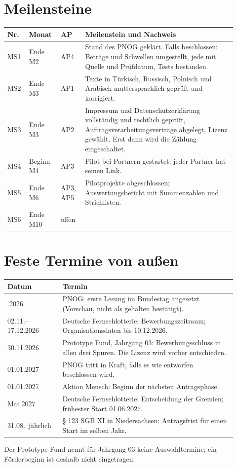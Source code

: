 \documentclass[11pt,a4paper,parskip=half-]{scrartcl}
\begin{document}
\section*{Meilensteine}
\begin{longtable}{@{}L{0.07\linewidth}L{0.13\linewidth}L{0.10\linewidth}L{0.62\linewidth}@{}}
\toprule
\textbf{Nr.} & \textbf{Monat} & \textbf{AP} & \textbf{Meilenstein und Nachweis} \\
\midrule
\endhead
\bottomrule
\endlastfoot
MS1 & Ende M2 & AP4 & Stand des PNOG geklärt. Falls beschlossen: Beträge und Schwellen umgestellt,
  jede mit Quelle und Prüfdatum, Tests bestanden. \\
MS2 & Ende M3 & AP1 & Texte in Türkisch, Russisch, Polnisch und Arabisch muttersprachlich geprüft und
  korrigiert. \\
MS3 & Ende M3 & AP2 & Impressum und Datenschutzerklärung vollständig und rechtlich geprüft,
  Auftragsverarbeitungsverträge abgelegt, Lizenz gewählt. Erst dann wird die Zählung eingeschaltet. \\
MS4 & Beginn M4 & AP3 & Pilot bei  Partnern gestartet; jeder Partner hat seinen Link. \\
MS5 & Ende M6 & AP3, AP5 & Pilotprojekte abgeschlossen; Auswertungsbericht mit Summenzahlen und Strichlisten. \\
MS6 & Ende M10 & offen &  \\
\end{longtable}

\section*{Feste Termine von außen}
\begin{longtable}{@{}L{0.22\linewidth}L{0.70\linewidth}@{}}
\toprule
\textbf{Datum} & \textbf{Termin} \\
\midrule
\endhead
\bottomrule
{}.2026 & PNOG: erste Lesung im Bundestag angesetzt (Vorschau, nicht als gehalten bestätigt). \\
02.11.--17.12.2026 & Deutsche Fernsehlotterie: Bewerbungszeitraum; Organisationsdaten bis 10.12.2026. \\
30.11.2026 & Prototype Fund, Jahrgang 03: Bewerbungsschluss in allen drei Spuren.
  Die Lizenz wird vorher entschieden. \\
01.01.2027 & PNOG tritt in Kraft, falls es wie entworfen beschlossen wird. \\
01.01.2027 & Aktion Mensch: Beginn der nächsten Antragsphase. \\
Mai 2027 & Deutsche Fernsehlotterie: Entscheidung der Gremien; frühester Start 01.06.2027. \\
31.08.\ jährlich & § 123 SGB XI in Niedersachsen: Antragsfrist für einen Start im selben Jahr. \\
\end{longtable}
Der Prototype Fund nennt für Jahrgang 03 keine Auswahltermine; ein Förderbeginn ist deshalb nicht
eingetragen.
\end{document}
